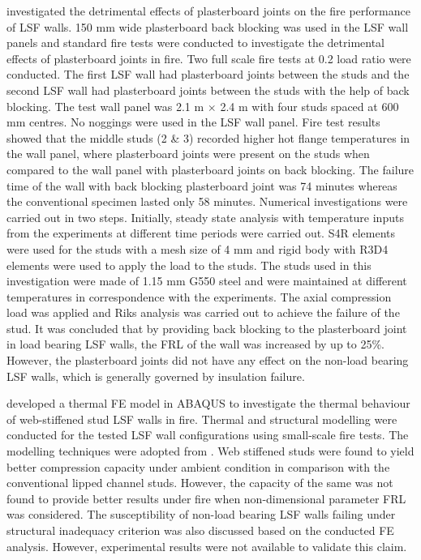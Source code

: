 \citet{Ariyanayagam2016} investigated the detrimental effects of plasterboard joints on the fire performance of LSF walls. 150 mm wide plasterboard back blocking was used in the LSF wall panels and standard fire tests were conducted to investigate the detrimental effects of plasterboard joints in fire. Two full scale fire tests at 0.2 load ratio were conducted. The first LSF wall had plasterboard joints between the studs and the second LSF wall had plasterboard joints between the studs with the help of back blocking. The test wall panel was 2.1 m $\times$ 2.4 m with four studs spaced at 600 mm centres. No noggings were used in the LSF wall panel. Fire test results showed that the middle studs (2 \& 3) recorded higher hot flange temperatures in the wall panel, where plasterboard joints were present on the studs when compared to the wall panel with plasterboard joints on back blocking. The failure time of the wall with back blocking plasterboard joint was 74 minutes whereas the conventional specimen lasted only 58 minutes. Numerical investigations were carried out in two steps. Initially, steady state analysis with temperature inputs from the experiments at different time periods were carried out. S4R elements were used for the studs with a mesh size of 4 mm and rigid body with R3D4 elements were used to apply the load to the studs. The studs used in this investigation were made of 1.15 mm G550 steel and were maintained at different temperatures in correspondence with the experiments. The axial compression load was applied and Riks analysis was carried out to achieve the failure of the stud. It was concluded that by providing back blocking to the plasterboard joint in load bearing LSF walls, the FRL of the wall was increased by up to 25\%. However, the plasterboard joints did not have any effect on the non-load bearing LSF walls, which is generally governed by insulation failure.

\citet{Dias2018} developed a thermal FE model in ABAQUS to investigate the thermal behaviour of web-stiffened stud LSF walls in fire. Thermal and structural modelling were conducted for the tested LSF wall configurations using small-scale fire tests. The modelling techniques were adopted from \citet{Rusthi2017}. Web stiffened studs were found to yield better compression capacity under ambient condition in comparison with the conventional lipped channel studs. However, the capacity of the same was not found to provide better results under fire when non-dimensional parameter FRL was considered. The susceptibility of non-load bearing LSF walls failing under structural inadequacy criterion was also discussed based on the conducted FE analysis. However, experimental results were not available to validate this claim. 

